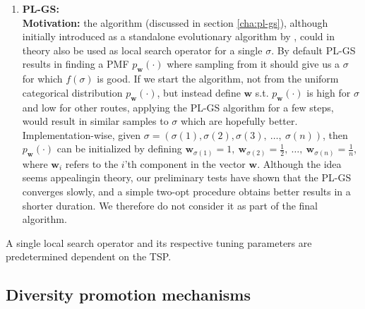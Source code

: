 \documentclass[a4paper,10pt]{article}
\newcommand{\ReplaceMe}[1]{{\color{blue}#1}}
\begin{document}
\begin{enumerate}
		\item \textbf{PL-GS:} \\
		\textbf{Motivation:} the algorithm (discussed in section \ref{cha:pl-gs}), although initially introduced as a standalone evolutionary algorithm by \citeauthor{santucci_gradient_2020}, could in theory also be used as local search operator for a single $\sigma$. By default PL-GS results in finding a PMF $p_\mathbf{w}(\cdot)$ where sampling from it should give us a $\sigma$ for which $f(\sigma)$ is good. If we start the algorithm, not from the uniform categorical distribution $p_\mathbf{w}(\cdot)$, but instead define $\mathbf{w}$ s.t. $p_\mathbf{w}(\cdot)$ is high for $\sigma$ and low for other routes, applying the PL-GS algorithm for a few steps, would result in similar samples to $\sigma$ which are hopefully better. \\
		Implementation-wise, given $\sigma = \left( \sigma(1), \sigma(2), \sigma(3),~\dots,~\sigma(n) \right)$, then $p_\mathbf{w}(\cdot)$ can be initialized by defining $\mathbf{w}_{\sigma(1)} = 1,~\mathbf{w}_{\sigma(2)} = \frac{1}{2},~\dots,~\mathbf{w}_{\sigma(n)} = \frac{1}{n}$, where $\mathbf{w}_i$ refers to the $i$'th component in the vector $\mathbf{w}$. Although the idea seems appealingin theory, our preliminary tests have shown that the PL-GS converges slowly, and a simple two-opt procedure obtains better results in a shorter duration. We therefore do not consider it as part of the final algorithm.
	\end{enumerate}
	A single local search operator and its respective tuning parameters are predetermined dependent on the TSP.
		



\subsection{Diversity promotion mechanisms} \label{cha:diversity}
	
\end{document}
